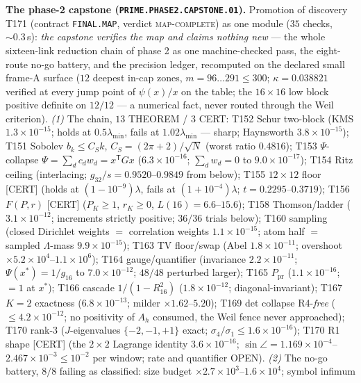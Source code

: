 \documentclass[11pt,a4paper]{article}
\begin{document}
\par\smallskip\noindent\textbf{The phase-2 capstone
(\texttt{PRIME.PHASE2.CAPSTONE.01}).}
Promotion of discovery T171 (contract \texttt{FINAL.MAP}, verdict
\textsc{map-complete}) as one module ($35$ checks, ${\sim}0.3$\,s):
\emph{the capstone verifies the map and claims nothing new} --- the
whole sixteen-link reduction chain of phase 2 as one machine-checked
pass, the eight-route no-go battery, and the precision ledger,
recomputed on the declared small frame-A surface ($12$ deepest in-cap
zones, $m=96\ldots291\le300$; $\kappa=0.038821$ verified at every jump
point of $\psi(x)/x$ on the table; the $16\times16$ low block positive
definite on $12/12$ --- a numerical fact, never routed through the Weil
criterion).
\emph{(1)} The chain, $13$ THEOREM / $3$ CERT: T152 Schur two-block
(KMS $1.3\times10^{-15}$; holds at $0.5\lambda_{\min}$, fails at
$1.02\lambda_{\min}$ --- sharp; Haynsworth $3.8\times10^{-15}$); T151
Sobolev $b_k\le C_Sk$, $C_S=(2\pi+2)/\sqrt N$ (worst ratio $0.4816$);
T153 $\Psi$-collapse $\Psi=\sum_dc_dw_d=x^{\mathsf T}Gx$
($6.3\times10^{-16}$; $\sum_dw_d=0$ to $9.0\times10^{-17}$); T154 Ritz
ceiling (interlacing; $g_{32}/s=0.9520$--$0.9849$ from below); T155
$12\times12$ floor [CERT] (holds at $(1-10^{-9})\lambda$, fails at
$(1+10^{-4})\lambda$; $t=0.2295$--$0.3719$); T156 $F(P,r)$ [CERT]
($P_K\ge1$, $r_K\ge0$, $L(16)=6.6$--$15.6$); T158 Thomson/ladder
($3.1\times10^{-12}$; increments strictly positive; $36/36$ trials
below); T160 sampling (closed Dirichlet weights $=$ correlation
weights $1.1\times10^{-15}$; atom half $=$ sampled $\Lambda$-mass
$9.9\times10^{-15}$); T163 TV floor/swap (Abel $1.8\times10^{-11}$;
overshoot $\times5.2\times10^{4}$--$1.1\times10^{6}$); T164
gauge/quantifier (invariance $2.2\times10^{-11}$; $\Psi(x^*)=1/g_{16}$
to $7.0\times10^{-12}$; $48/48$ perturbed larger); T165
$P_{\mathrm{pr}}$ ($1.1\times10^{-16}$; $=1$ at $x^*$); T166 cascade
$1/(1-R_{16}^2)$ ($1.8\times10^{-12}$; diagonal-invariant); T167
$K=2$ exactness ($6.8\times10^{-13}$; milder $\times1.62$--$5.20$);
T169 det collapse R4-\emph{free} ($\le4.2\times10^{-12}$; no
positivity of $A_h$ consumed, the Weil fence never approached); T170
rank-3 ($J$-eigenvalues $\{-2,-1,+1\}$ exact;
$\sigma_4/\sigma_1\le1.6\times10^{-16}$); T170 R1 shape [CERT] (the
$2\times2$ Lagrange identity $3.6\times10^{-16}$; $\sin\angle=
1.169\times10^{-4}$--$2.467\times10^{-3}\le10^{-2}$ per window; rate
and quantifier OPEN).
\emph{(2)} The no-go battery, $8/8$ failing as classified: size budget
$\times2.7\times10^{3}$--$1.6\times10^{4}$; symbol infimum
\end{document}
